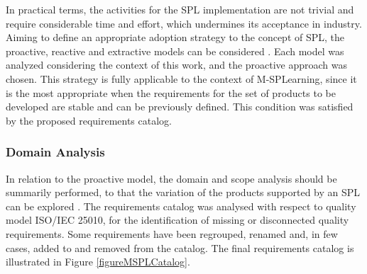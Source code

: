 In practical terms, the activities for the SPL implementation are not trivial and require considerable time and effort, which undermines its acceptance in industry. Aiming to define an appropriate adoption strategy to the concept of SPL, the proactive, reactive and extractive models can be considered \cite{krueger02}.
Each model was analyzed considering the context of this work, and the proactive approach was chosen. This strategy is fully applicable to the context of M-SPLearning, since it is the most appropriate when the requirements for the set of products to be developed are stable and can be previously defined. This condition was satisfied by the proposed requirements catalog.

\subsubsection{Domain Analysis}\label{domainAnalysis}

In relation to the proactive model, the domain and scope analysis should be summarily performed, to that the variation of the products supported by an SPL can be explored \cite{krueger02}. The requirements catalog \cite{filho13} was analysed with respect to quality model ISO/IEC 25010, for the identification of missing or disconnected quality requirements.
Some requirements have been regrouped, renamed and, in few cases, added to and removed from the catalog. The final requirements catalog is illustrated in Figure \ref{figureMSPLCatalog}.

